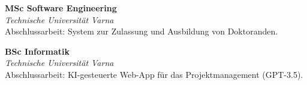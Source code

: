 \textbf{MSc Software Engineering}  \\
\textit{Technische Universität Varna} \\
\footnotesize Abschlussarbeit: System zur Zulassung und Ausbildung von Doktoranden. \par

\vspace{1ex}
\textbf{BSc Informatik}  \\
\textit{Technische Universität Varna} \\
\footnotesize Abschlussarbeit: KI-gesteuerte Web-App für das Projektmanagement (GPT-3.5).
